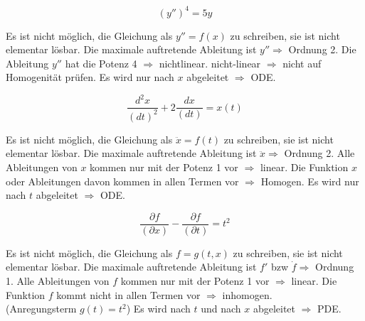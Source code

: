 \begin{equation*}
    \left( y'' \right)^{4} = 5y%
\end{equation*}

\begin{outline}
    \1 Es ist nicht möglich, die Gleichung als $y''=f(x)$ zu schreiben, sie
    ist nicht elementar lösbar.
    \1 Die maximale auftretende Ableitung ist $y''\Rightarrow$ Ordnung 2.
    \1 Die Ableitung $y''$ hat die Potenz 4 $\Rightarrow$ nichtlinear.
    \1 nicht-linear $\Rightarrow$ nicht auf Homogenität prüfen.
    \1 Es wird nur nach $x$ abgeleitet $\Rightarrow$ ODE.
\end{outline}

\begin{equation*}
    \frac{d^2x}{\left( d t \right)^{2}} + 2
    \frac{d x}{\left( d t \right)} = x\left( t \right)
\end{equation*}

\begin{outline}
    \1 Es ist nicht möglich, die Gleichung als $\ddot{x}=f(t)$ zu schreiben, sie
    ist nicht elementar lösbar.
    \1 Die maximale auftretende Ableitung ist $\ddot{x}\Rightarrow$ Ordnung 2.
    \1 Alle Ableitungen von $x$ kommen nur mit der Potenz 1 vor $\Rightarrow$ linear.
    \1 Die Funktion $x$ oder Ableitungen davon kommen in allen Termen vor $\Rightarrow$ Homogen.
    \1 Es wird nur nach $t$ abgeleitet $\Rightarrow$ ODE.
\end{outline}

\begin{equation*}
    \frac{\partial f}{\left( \partial x \right)} - 
    \frac{\partial f}{\left( \partial t \right)} = t^{2} 
\end{equation*}

\begin{outline}
    \1 Es ist nicht möglich, die Gleichung als $f=g(t,x)$ zu schreiben, sie
    ist nicht elementar lösbar.
    \1 Die maximale auftretende Ableitung ist $f'$ bzw $\dot{f}\Rightarrow$ Ordnung 1.
    \1 Alle Ableitungen von $f$ kommen nur mit der Potenz 1 vor $\Rightarrow$ linear.
    \1 Die Funktion $f$ kommt nicht in allen Termen vor $\Rightarrow$ inhomogen.\\
       (Anregungsterm $g(t)=t^{2}$)
    \1 Es wird nach $t$ und nach $x$ abgeleitet $\Rightarrow$ PDE.
\end{outline}



